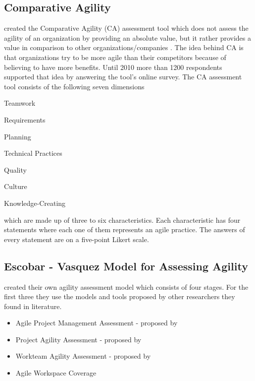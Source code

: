 \subsection{Comparative Agility} %
\citet{comparative_agility} created the Comparative Agility (CA) assessment tool which does not assess the agility of an organization by providing an absolute value, but it rather provides a value in comparison to other organizations/companies \cite{comparative_agility_web}. The idea behind CA is that organizations try to be more agile than their competitors because of believing to have more benefits. Until 2010 more than 1200 respondents supported that idea by answering the tool's online survey. The CA assessment tool consists of the following seven dimensions 
\begin{inparaenum} [a\upshape)]
	\item Teamwork
	\item Requirements
	\item Planning
	\item Technical Practices
	\item Quality
	\item Culture
	\item Knowledge-Creating
\end{inparaenum}
which are made up of three to six characteristics. Each characteristic has four statements where each one of them represents an agile practice. The answers of every statement are on a five-point Likert scale.

\subsection{Escobar - Vasquez Model for Assessing Agility} %

\citet{6427226} created their own agility assessment model which consists of four stages. For the first three they use the models and tools proposed by other researchers they found in literature.
\begin{itemize}
\item Agile Project Management Assessment - proposed by \citet{qumer2006measuring}
\item Project Agility Assessment - proposed by \citet{taylor}
\item Workteam Agility Assessment - proposed by \citet{Leffingwell}
\item Agile Workspace Coverage
\end{itemize}

